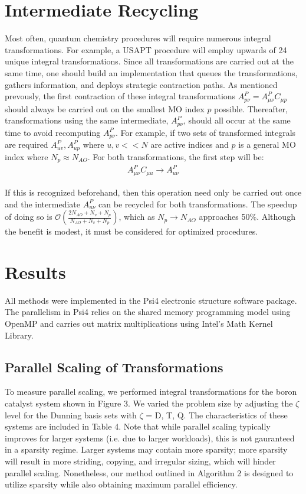 \section{Intermediate Recycling}

Most often, quantum chemistry procedures will require numerous integral transformations. For example, a USAPT procedure will employ
upwards of 24 unique integral transformations. Since all transformations are carried out at the same time, one should build an 
implementation that queues the transformations, gathers information, and deploys strategic contraction paths.
As mentioned prevously, the first contraction of these integral transformations $A_{p \nu}^P=A_{\mu \nu}^PC_{\mu p}$ 
should always be carried out on the smallest MO index $p$ 
possible. Thereafter, transformations using the same intermediate, $A_{p \nu}^P$, should all occur at the same time to avoid
recomputing $A_{p \nu}^P$. 
For example, if two sets of transformed integrals are required $A^P_{u v}, A^P_{up}$ where $u,v << N$ are active 
indices and $p$ is a general MO index where $N_p \approx N_{AO}$. For both transformations, the first step will be:
\begin{align} 
A^P_{\mu \nu}C_{\mu u} \rightarrow A^P_{u \nu} 
\end{align}

\noindent If this is recognized beforehand, then this operation need only be carried out once and 
the intermediate $A^P_{u \nu}$ can be recycled
for both transformations. The speedup of doing so is $\mathcal{O}(\frac{2N_{AO} + N_v + N_p}{N_{AO} + N_v + N_p})$, 
which as $N_p \rightarrow N_{AO}$ approaches
50\%. Although the benefit is modest, it must be considered for optimized procedures.

\section{Results}

All methods were implemented in the {\sc Psi4} electronic structure software package.
The parallelism in {\sc Psi4} relies on the shared memory programming model using OpenMP 
and carries out matrix multiplications using Intel's Math Kernel
Library. 


\subsection{Parallel Scaling of Transformations}

To measure parallel scaling, we performed integral transformations for the boron catalyst system shown in Figure 3. 
We varied the problem size by adjusting the $\zeta$ level for the Dunning basis sets with $\zeta$ = D, T, Q.
The characteristics of these systems are included in Table 4. Note that while parallel scaling typically improves
for larger systems (i.e. due to larger workloads),
this is not gauranteed in a sparsity regime. Larger systems may contain more sparsity;
more sparsity will result in more striding, copying, and irregular sizing,
which will hinder parallel scaling. Nonetheless, our method outlined in Algorithm 2 is designed to utilize sparsity while also
obtaining maximum parallel efficiency. 

